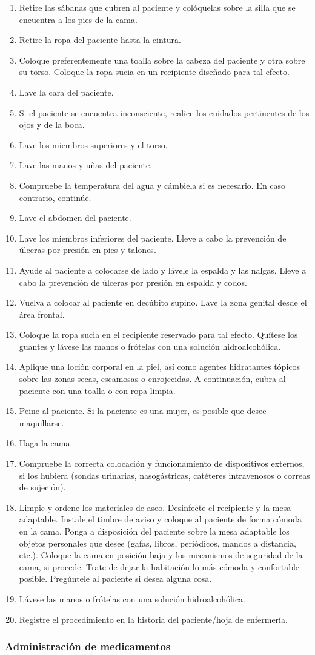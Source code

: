 \begin{enumerate}[topsep=0pt, partopsep=0pt,itemsep=0pt,parsep=0pt]
    \item Retire las sábanas que cubren al paciente y colóquelas sobre la silla que se encuentra a los pies de la cama.
    \item Retire la ropa del paciente hasta la cintura.
    \item Coloque preferentemente una toalla sobre la cabeza del paciente y otra sobre su torso. Coloque la ropa sucia en un recipiente diseñado para tal efecto.
    \item Lave la cara del paciente.
    \item Si el paciente se encuentra inconsciente, realice los cuidados pertinentes de los ojos y de la boca.
    \item Lave los miembros superiores y el torso.
    \item Lave las manos y uñas del paciente.
    \item Compruebe la temperatura del agua y cámbiela si es necesario. En caso contrario, continúe.
    \item Lave el abdomen del paciente.
    \item Lave los miembros inferiores del paciente. Lleve a cabo la prevención de úlceras por presión en pies y talones.
    \item Ayude al paciente a colocarse de lado y lávele la espalda y las nalgas. Lleve a cabo la prevención de úlceras por presión en espalda y codos.
    \item Vuelva a colocar al paciente en decúbito supino. Lave la zona genital desde el área frontal.
    \item Coloque la ropa sucia en el recipiente reservado para tal efecto. Quítese los guantes y lávese las manos o frótelas con una solución hidroalcohólica.
    \item Aplique una loción corporal en la piel, así como agentes hidratantes tópicos sobre las zonas secas, escamosas o enrojecidas. A continuación, cubra al paciente con una toalla o con ropa limpia.
    \item Peine al paciente. Si la paciente es una mujer, es posible que desee maquillarse.
    \item Haga la cama.
    \item Compruebe la correcta colocación y funcionamiento de dispositivos externos, si los hubiera (sondas urinarias, nasogástricas, catéteres intravenosos o correas de sujeción).
    \item Limpie y ordene los materiales de aseo. Desinfecte el recipiente y la mesa adaptable. Instale el timbre de aviso y coloque al paciente de forma cómoda en la cama. Ponga a disposición del paciente sobre la mesa adaptable los objetos personales que desee (gafas, libros, periódicos, mandos a distancia, etc.). Coloque la cama en posición baja y los mecanismos de seguridad de la cama, si procede. Trate de dejar la habitación lo más cómoda y confortable posible. Pregúntele al paciente si desea alguna cosa.
    \item Lávese las manos o frótelas con una solución hidroalcohólica.
    \item Registre el procedimiento en la historia del paciente/hoja de enfermería.
\end{enumerate}
\subsubsection{Administración de medicamentos}




